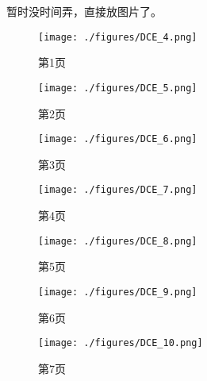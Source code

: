 
\begin{issues}
\issueTODO
\end{issues}

暂时没时间弄，直接放图片了。
\begin{figure}[ht]
\centering
\texttt{[image: ./figures/DCE\_4.png]}
\caption{第1页} \label{DCE_fig4}
\end{figure}
\begin{figure}[ht]
\centering
\texttt{[image: ./figures/DCE\_5.png]}
\caption{第2页} \label{DCE_fig5}
\end{figure}
\begin{figure}[ht]
\centering
\texttt{[image: ./figures/DCE\_6.png]}
\caption{第3页} \label{DCE_fig6}
\end{figure}
\begin{figure}[ht]
\centering
\texttt{[image: ./figures/DCE\_7.png]}
\caption{第4页} \label{DCE_fig7}
\end{figure}
\begin{figure}[ht]
\centering
\texttt{[image: ./figures/DCE\_8.png]}
\caption{第5页} \label{DCE_fig8}
\end{figure}
\begin{figure}[ht]
\centering
\texttt{[image: ./figures/DCE\_9.png]}
\caption{第6页} \label{DCE_fig9}
\end{figure}
\begin{figure}[ht]
\centering
\texttt{[image: ./figures/DCE\_10.png]}
\caption{第7页} \label{DCE_fig10}
\end{figure}
